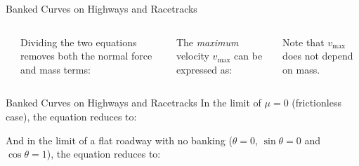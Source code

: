 \documentclass[12pt,compress,aspectratio=169]{beamer}
\begin{document}
\begin{frame}{Banked Curves on Highways and Racetracks}
  \begin{columns}
    \centering
    \\

    Dividing the two equations removes both the normal force and mass terms:


    The \emph{maximum} velocity $v_\text{max}$ can be expressed as:


    Note that $v_\text{max}$ does not depend on mass.
  \end{columns}
\end{frame}



\begin{frame}{Banked Curves on Highways and Racetracks}
  In the limit of $\mu=0$ (frictionless case), the equation reduces to:


  And in the limit of a flat roadway with no banking ($\theta=0$,
  $\sin\theta=0$ and $\cos\theta=1$), the equation reduces to:

\end{frame}




%
%
\end{document}
